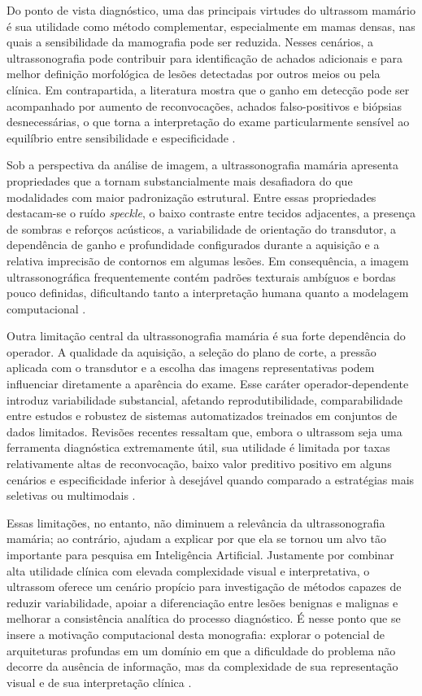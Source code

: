 \documentclass[tcc,capa]{texufpel}
\begin{document}
Do ponto de vista diagnóstico, uma das principais virtudes do ultrassom mamário é sua utilidade como método complementar, especialmente em mamas densas, nas quais a sensibilidade da mamografia pode ser reduzida. Nesses cenários, a ultrassonografia pode contribuir para identificação de achados adicionais e para melhor definição morfológica de lesões detectadas por outros meios ou pela clínica. Em contrapartida, a literatura mostra que o ganho em detecção pode ser acompanhado por aumento de reconvocações, achados falso-positivos e biópsias desnecessárias, o que torna a interpretação do exame particularmente sensível ao equilíbrio entre sensibilidade e especificidade \cite{Hussein2023,Lobig2023}.

Sob a perspectiva da análise de imagem, a ultrassonografia mamária apresenta propriedades que a tornam substancialmente mais desafiadora do que modalidades com maior padronização estrutural. Entre essas propriedades destacam-se o ruído \textit{speckle}, o baixo contraste entre tecidos adjacentes, a presença de sombras e reforços acústicos, a variabilidade de orientação do transdutor, a dependência de ganho e profundidade configurados durante a aquisição e a relativa imprecisão de contornos em algumas lesões. Em consequência, a imagem ultrassonográfica frequentemente contém padrões texturais ambíguos e bordas pouco definidas, dificultando tanto a interpretação humana quanto a modelagem computacional \cite{Trepanier2023,Afrin2023}.

Outra limitação central da ultrassonografia mamária é sua forte dependência do operador. A qualidade da aquisição, a seleção do plano de corte, a pressão aplicada com o transdutor e a escolha das imagens representativas podem influenciar diretamente a aparência do exame. Esse caráter operador-dependente introduz variabilidade substancial, afetando reprodutibilidade, comparabilidade entre estudos e robustez de sistemas automatizados treinados em conjuntos de dados limitados. Revisões recentes ressaltam que, embora o ultrassom seja uma ferramenta diagnóstica extremamente útil, sua utilidade é limitada por taxas relativamente altas de reconvocação, baixo valor preditivo positivo em alguns cenários e especificidade inferior à desejável quando comparado a estratégias mais seletivas ou multimodais \cite{Trepanier2023,Hussein2023}.

Essas limitações, no entanto, não diminuem a relevância da ultrassonografia mamária; ao contrário, ajudam a explicar por que ela se tornou um alvo tão importante para pesquisa em Inteligência Artificial. Justamente por combinar alta utilidade clínica com elevada complexidade visual e interpretativa, o ultrassom oferece um cenário propício para investigação de métodos capazes de reduzir variabilidade, apoiar a diferenciação entre lesões benignas e malignas e melhorar a consistência analítica do processo diagnóstico. É nesse ponto que se insere a motivação computacional desta monografia: explorar o potencial de arquiteturas profundas em um domínio em que a dificuldade do problema não decorre da ausência de informação, mas da complexidade de sua representação visual e de sua interpretação clínica \cite{Dan2024,Trepanier2023}.
\end{document}
